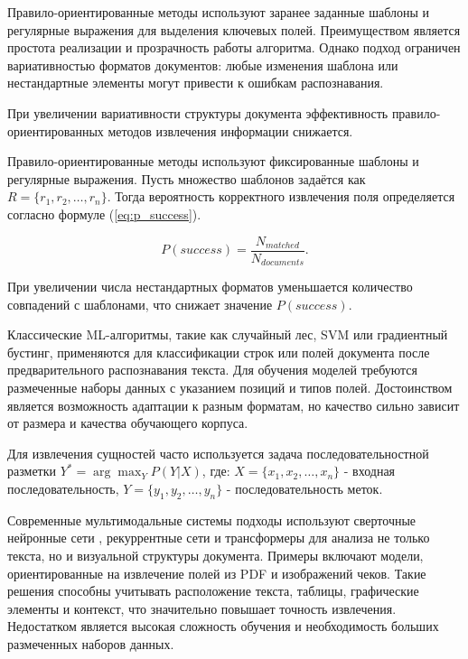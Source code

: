 \documentclass[14pt,a4paper]{extarticle}
\newenvironment{my_theorem}[1][Теорема]
{\par\indent\noindent{#1.} \upshape}
{\par}
\newenvironment{my_proof}
{\par\indent\noindent{Доказательство.} \upshape}
{\par\hfill $\square$}
\begin{document}
Правило-ориентированные методы используют заранее заданные шаблоны и регулярные выражения для выделения ключевых полей. Преимуществом является простота реализации и прозрачность работы алгоритма. Однако подход ограничен вариативностью форматов документов: любые изменения шаблона или нестандартные элементы могут привести к ошибкам распознавания.

\begin{my_theorem}
При увеличении вариативности структуры документа
эффективность правило-ориентированных методов
извлечения информации снижается.
\end{my_theorem}

\begin{my_proof}
Правило-ориентированные методы используют фиксированные
шаблоны и регулярные выражения. Пусть множество шаблонов задаётся как $R=\{r_1,r_2,\dots,r_n\}$. Тогда вероятность корректного извлечения поля
определяется согласно формуле (\ref{eq:p_success}).

\begin{equation}
P(success)=
\frac{N_{matched}}{N_{documents}}.
\label{eq:p_success}
\end{equation}

При увеличении числа нестандартных форматов
уменьшается количество совпадений с шаблонами,
что снижает значение $P(success)$.
\end{my_proof}

Классические ML-алгоритмы, такие как случайный лес, SVM или градиентный бустинг, применяются для классификации строк или полей документа после предварительного распознавания текста. Для обучения моделей требуются размеченные наборы данных с указанием позиций и типов полей. Достоинством является возможность адаптации к разным форматам, но качество сильно зависит от размера и качества обучающего корпуса.

Для извлечения сущностей часто используется
задача последовательностной разметки $Y^* = \arg\max_{Y} P(Y|X)$,
где: $X = \{x_1, x_2, \dots, x_n\}$ - входная последовательность, $Y = \{y_1, y_2, \dots, y_n\}$ - последовательность меток.


Современные мультимодальные системы подходы используют сверточные нейронные сети , рекуррентные сети и трансформеры для анализа не только текста, но и визуальной структуры документа. Примеры включают модели, ориентированные на извлечение полей из PDF и изображений чеков. Такие решения способны учитывать расположение текста, таблицы, графические элементы и контекст, что значительно повышает точность извлечения. Недостатком является высокая сложность обучения и необходимость больших размеченных наборов данных.
\end{document}
